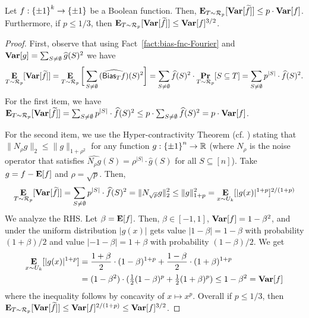 \begin{theorem}\label{thm:HC}
Let $f: {\{\pm1\}}^k \to {\{\pm1\}}$ be a Boolean function.
Then, 
$\mathop{\bf E\/}_{T\sim \mathcal{R}_p}[{\mathop{\bf Var\/}}[\widetilde{f}]] \le p \cdot {\mathop{\bf Var\/}}[f]$. Furthermore, if $p \le 1/3$, then
$\mathop{\bf E\/}_{T\sim \mathcal{R}_p}[{\mathop{\bf Var\/}}[\widetilde{f}]] \le {\mathop{\bf Var\/}}[f]^{3/2}$.
\end{theorem}

\begin{proof}
First, observe that using Fact~\ref{fact:bias-fnc-Fourier} and ${\mathop{\bf Var\/}}[g] = \sum_{S\neq \emptyset} \widehat{g}(S)^2$  we have
$$\mathop{\bf E\/}_{T\sim \mathcal{R}_p}[{\mathop{\bf Var\/}}[\widetilde{f}]] = 
\mathop{\bf E\/}_{T\sim \mathcal{R}_p}\bigg[\sum_{S\neq \emptyset} \widehat{(\mathsf{Bias}_T f)}(S)^2\bigg] = 
\sum_{S\neq \emptyset} \widehat{f}(S)^2 \cdot \mathop{\bf Pr\/}_{T\sim \mathcal{R}_p}[S \subseteq T] = 
\sum_{S\neq \emptyset} {p^{|S|} \cdot \widehat{f}(S)^2 }.$$
For the first item, we have $\mathop{\bf E\/}_{T\sim \mathcal{R}_p}[{\mathop{\bf Var\/}}[\widetilde{f}]] = \sum_{S\neq \emptyset} {p^{|S|} \cdot \widehat{f}(S)^2 } \le p \cdot \sum_{S\neq \emptyset} {\widehat{f}(S)^2} = p\cdot {\mathop{\bf Var\/}}[f]$.


For the second item, we use the Hyper-contractivity Theorem \cite{Bonami70} (cf. \cite[Ch.~9]{OdonnellBook}) stating that $\|N_{\rho} g\|_2 \le \|g\|_{1+\rho^2}$ for any function $g:{\{\pm1\}}^n \to {\mathbb{R}}$ (where $N_{\rho}$ is the noise operator that satisfies $\hat{N_{\rho} g}(S) = \rho^{|S|} \cdot \hat{g}(S)$ for all $S\subseteq [n]$).
Take $g = f- \mathop{\bf E\/}[f]$ and $\rho = \sqrt{p}$.
Then, 
$$
\mathop{\bf E\/}_{T\sim \mathcal{R}_p}[{\mathop{\bf Var\/}}[\widetilde{f}]] = \sum_{S\neq \emptyset} {p^{|S|} \cdot \widehat{f}(S)^2 } =  
\|N_{\sqrt{p}} g\|^{2}_2 \le \|g\|_{1+p}^{2} = \mathop{\bf E\/}_{x\sim U_k}[|g(x)|^{1+p}]^{2/(1+p)}
$$
We analyze the RHS.
Let $\beta = \mathop{\bf E\/}[f]$. %
Then, $\beta\in [-1,1]$, ${\mathop{\bf Var\/}}[f] = 1-\beta^2$, and under the uniform distribution $|g(x)|$ gets value $|1-\beta| = 1-\beta$ with probability $(1+\beta)/2$ and value $|-1-\beta| = 1+\beta$ with probability $(1-\beta)/2$.
We get 
\begin{align*}
	\mathop{\bf E\/}_{x\sim U_k}[|g(x)|^{1+p}]
	&= \frac{1+\beta}{2} \cdot (1-\beta)^{1+p} + \frac{1-\beta}{2} \cdot (1+\beta)^{1+p} \\
	&= (1-\beta^2) \cdot (\tfrac{1}{2} (1-\beta)^{p} + \tfrac{1}{2}(1+\beta)^{p}) 
	\le 1-\beta^2 = {\mathop{\bf Var\/}}[f]
\end{align*}
where the inequality follows by concavity of $x \mapsto x^{p}$.
%
%
Overall if $p\le 1/3$, then 
$\mathop{\bf E\/}_{T\sim \mathcal{R}_p}[{\mathop{\bf Var\/}}[\widetilde{f}]]  \le   {\mathop{\bf Var\/}}[f]^{2/(1+p)} \le  {\mathop{\bf Var\/}}[f]^{3/2}$.
\end{proof}






